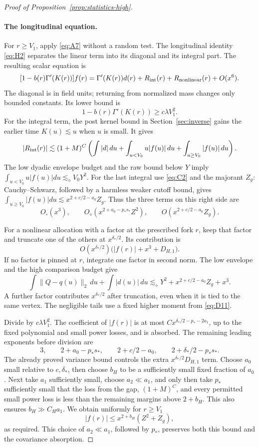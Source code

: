 \begin{proof}[Proof of Proposition~\ref{prop:statistics-high}]
\paragraph{The longitudinal equation.}
For $r\ge V_1$, apply \eqref{eq:A7} without a random test.
The longitudinal identity \eqref{eq:H2} separates the linear term
into its diagonal and its integral part.  The resulting scalar equation
is
\[
 [1-b(r)\Gamma'(K(r))]f(r)
     =\Gamma'(K(r))d(r)+R_{\rm int}(r)+R_{\rm nonlinear}(r)+O(x^6).
\]
The diagonal is in field units; returning from normalized mass changes
only bounded constants.  Its lower bound is
\[
 1-b(r)\Gamma'(K(r))\ge c\lambda V_1^2.
\]
For the integral term, the post kernel bound in Section~\ref{sec:inverse}
gains the earlier time $K(u)\lesssim u$ when $u$ is small.  It gives
\[
 |R_{\rm int}(r)|\lesssim(1+M)^C\left(
       \int|d|\,du+\int_{u<V_0}u|f(u)|\,du
                          +\int_{u\ge V_0}|f(u)|\,du\right).
\]
The low dyadic envelope budget and the raw bound below $Y$ imply
$\int_{u<V_0}u|f(u)|du\lesssim_\diamond V_0Y^2$.
For the last integral use \eqref{eq:C2} and the majorant $Z_g$:
Cauchy--Schwarz, followed by a harmless weaker cutoff bound, gives
$\int_{u\ge V_0}|f(u)|du\lesssim
x^{2+c/2-a_0}Z_g$.  Thus the three terms on this right side are
\[
 O_\circ(x^3),\qquad
 O_\diamond(x^{2+a_0-p_*s_*}Z^2),\qquad
 O(x^{2+c/2-a_0}Z_g).
\]

For a nonlinear allocation with a factor at the prescribed fork $r$,
keep that factor and truncate one of the others at
$x^{\delta_*/2}$.  Its contribution is
\[
 O(x^{\delta_*/2})\bigl(|f(r)|+x^3+D_{H,1}\bigr).
\]
If no factor is pinned at $r$, integrate one factor in second norm.
The low envelope and the high comparison budget give
\[
 \int\|Q-q(u)\|_2\,du+\int|d(u)|\,du
 \lesssim_\diamond Y^2+x^{2+c/2-a_0}Z_g+x^3.
\]
A further factor contributes $x^{\delta_*/2}$ after truncation, even
when it is tied to the same vertex.  The negligible tails use a fixed
higher moment from \eqref{eq:D11}.

Divide by $c\lambda V_1^2$.  The coefficient of $|f(r)|$ is at most
$Cx^{\delta_*/2-p_*-2a_1}$, up to the fixed polynomial and small
power losses, and is absorbed.  The remaining leading exponents before
division are
\[
 3,\qquad 2+a_0-p_*s_*,\qquad
 2+c/2-a_0,\qquad 2+\delta_*/2-p_*s_*.
\]
The already proved variance bound controls the extra
$x^{\delta_*/2}D_{H,1}$ term.  Choose $a_0$ small relative to
$c,\delta_*$, then choose $b_H$ to be a sufficiently small fixed
fraction of $a_0$.  Next take $a_1$ sufficiently small, choose
$a_2\ll a_1$, and only then take $p_*$ sufficiently small that the
loss from the gap, $(1+M)^C$, and every permitted small power loss is
less than the remaining margins above $2+b_H$.
This also ensures $b_H\gg C_Ha_1$.  We obtain uniformly for $r\ge V_1$
\[
 |f(r)|\le x^{2+b_H}(Z^2+Z_g),
\]
as required.  This choice of $a_2\ll a_1$, followed by $p_*$,
preserves both this bound and the covariance absorption.
\end{proof}


